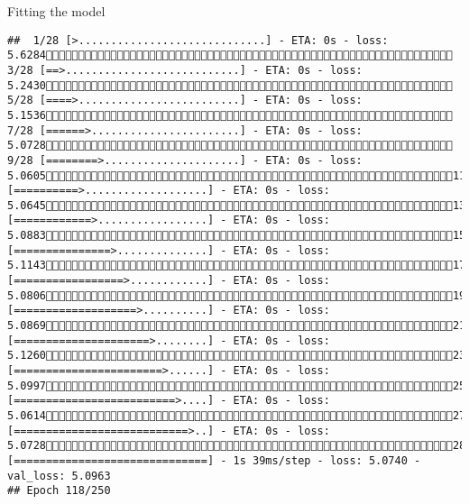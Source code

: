 \documentclass[
  ignorenonframetext,
]{beamer}
\begin{document}
\begin{frame}[fragile]{Fitting the model}
\begin{verbatim}
##  1/28 [>.............................] - ETA: 0s - loss: 5.6284 3/28 [==>...........................] - ETA: 0s - loss: 5.2430 5/28 [====>.........................] - ETA: 0s - loss: 5.1536 7/28 [======>.......................] - ETA: 0s - loss: 5.0728 9/28 [========>.....................] - ETA: 0s - loss: 5.060511/28 [==========>...................] - ETA: 0s - loss: 5.064513/28 [============>.................] - ETA: 0s - loss: 5.088315/28 [===============>..............] - ETA: 0s - loss: 5.114317/28 [=================>............] - ETA: 0s - loss: 5.080619/28 [===================>..........] - ETA: 0s - loss: 5.086921/28 [=====================>........] - ETA: 0s - loss: 5.126023/28 [=======================>......] - ETA: 0s - loss: 5.099725/28 [=========================>....] - ETA: 0s - loss: 5.061427/28 [===========================>..] - ETA: 0s - loss: 5.072828/28 [==============================] - 1s 39ms/step - loss: 5.0740 - val_loss: 5.0963
## Epoch 118/250

\end{verbatim}
\end{frame}
\end{document}
